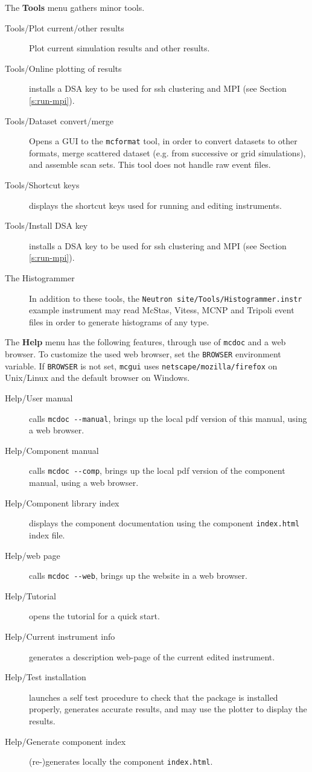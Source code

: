 \noindent The \textbf{Tools} menu gathers minor tools.
\begin{description}
\item[Tools/Plot current/other results] Plot current simulation results and
  other results.
\item[Tools/Online plotting of results] installs a DSA key to be used for ssh
  clustering and MPI (see Section \ref{s:run-mpi}).
\item[Tools/Dataset convert/merge] Opens a GUI to the \verb+mcformat+ tool, in
  order to convert datasets to other formats, merge scattered dataset (e.g. from
  successive or grid simulations), and assemble scan sets. This tool does not
  handle raw event files.
\item[Tools/Shortcut keys] displays the shortcut keys used for running and
  editing instruments.
\item[Tools/Install DSA key] installs a DSA key to be used for ssh clustering
  and MPI (see Section \ref{s:run-mpi}).
\item[The Histogrammer] In addition to these tools, the
  \verb+Neutron site/Tools/Histogrammer.instr+ example instrument may read
  McStas, Vitess, MCNP and Tripoli event files in order to generate histograms
  of any type.
\end{description}


\noindent The \textbf{Help} menu has the following features, through use of
\verb+mcdoc+ and a web browser. To customize the used web browser, set
the \verb+BROWSER+ environment variable. If \verb+BROWSER+ is not set,
\verb+mcgui+ uses \verb+netscape/mozilla/firefox+ on Unix/Linux and the default browser on
Windows.
\begin{description}
\item[Help/\MCS User manual] calls \verb+mcdoc --manual+, brings up the local
  pdf version of this manual, using a web browser.
\item[Help/\MCS Component manual] calls \verb+mcdoc --comp+, brings up the local
  pdf version of the component manual, using a web browser.
\item[Help/Component library index] displays the component documentation using
  the component \verb+index.html+ index file.
\item[Help/\MCS web page] calls \verb+mcdoc --web+, brings up the \MCS
  website in a web browser.
\item[Help/Tutorial] opens the \MCS tutorial for a quick start.
\item[Help/Current instrument info] generates a description web-page of the
  current edited instrument.
\item[Help/Test \MCS installation] launches a self test procedure to check that
  the \MCS package is installed properly, generates accurate results, and may
  use the plotter to display the results.
\item[Help/Generate component index] (re-)generates locally the component
  \verb+index.html+.
\end{description}


